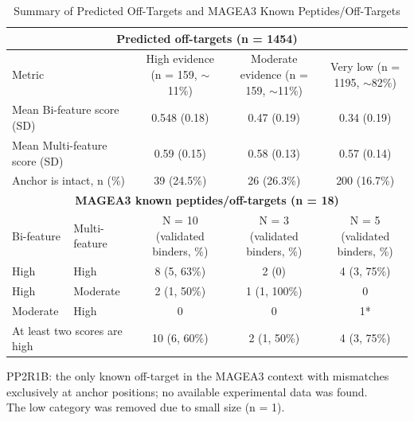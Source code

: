 \documentclass[times, twoside, watermark]{zHenriquesLab-StyleBioRxiv}
\begin{document}
        \begin{table}%
        \centering
        \caption{Summary of Predicted Off-Targets and MAGEA3 Known Peptides/Off-Targets\label{tab:tab2}}
        \begin{tabular}{@{}l|l|c|c|c@{}}
            \toprule
            \multicolumn{5}{c}{\textbf{Predicted off-targets (n = 1454)}} \\
            \midrule
            \multicolumn{2}{l|}{Metric} &
            \makecell{High evidence\\(n = 159, $\sim$11\%)} &
            \makecell{Moderate evidence\\(n = 159, $\sim$11\%)} &
            \makecell{Very low\\(n = 1195, $\sim$82\%)} \\
            \midrule
            \multicolumn{2}{l|}{Mean Bi-feature score (SD)} & 0.548 (0.18) & 0.47 (0.19) & 0.34 (0.19) \\
            \multicolumn{2}{l|}{Mean Multi-feature score (SD)} & 0.59 (0.15) & 0.58 (0.13) & 0.57 (0.14) \\
            \multicolumn{2}{l|}{Anchor is intact, n (\%)}     & 39 (24.5\%) & 26 (26.3\%) & 200 (16.7\%) \\
            \midrule
            \multicolumn{5}{c}{\textbf{MAGEA3 known peptides/off-targets (n = 18)}} \\
            \midrule
            Bi-feature & Multi-feature & 
            \makecell{N = 10 \\(validated binders, \%)} &
            \makecell{N = 3 \\(validated binders, \%)} &
            \makecell{N = 5 \\(validated binders, \%)} \\
            \midrule
            High     & High     & 8 (5, 63\%)     & 2 (0)           & 4 (3, 75\%) \\
            High     & Moderate & 2 (1, 50\%)     & 1 (1, 100\%)    & 0 \\
            Moderate & High     & 0               & 0               & 1* \\
            \midrule
            \multicolumn{2}{l|}{At least two scores are high} 
            & 10 (6, 60\%) & 2 (1, 50\%) & 4 (3, 75\%) \\
            \bottomrule
            \end{tabular}

            \begin{flushleft}
                \footnotesize *PP2R1B: the only known off-target in the MAGEA3 context with     mismatches exclusively at anchor positions; no available experimental data was found. \\
                The low category was removed due to small size (n = 1).
            \end{flushleft}
            \end{table}    
\end{document}
